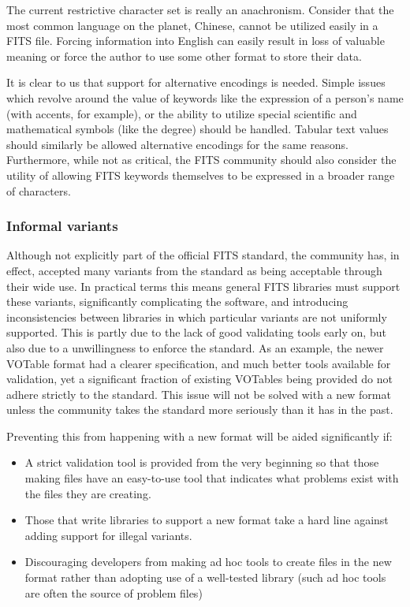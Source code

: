 \documentclass[final,authoryear,5p,times,twocolumn]{elsarticle}
\begin{document}
The current restrictive character set is really an
anachronism. Consider that the most common language on the planet,
Chinese, cannot be utilized easily in a FITS file. Forcing information
into English can easily result in loss of valuable meaning or force
the author to use some other format to store their data.


It is clear to us that support for alternative encodings is
needed. Simple issues which revolve around the value of keywords
like the expression of a person's name (with accents, for example), or
the ability to utilize special scientific and mathematical symbols
(like the degree) should be handled. Tabular text values should
similarly be allowed alternative encodings for the same
reasons. Furthermore, while not as critical, the FITS community should
also consider the utility of allowing FITS keywords themselves to be
expressed in a broader range of characters.


\subsubsection{Informal variants}


Although not explicitly part of the official FITS standard, the
community has, in effect, accepted many variants from the standard as
being acceptable through their wide use. In practical terms this means
general FITS libraries must support these variants, significantly
complicating the software, and introducing inconsistencies between
libraries in which particular variants are not uniformly
supported. This is partly due to the lack of good validating tools
early on, but also due to a unwillingness to enforce the standard. As
an example, the newer VOTable format \citep{2004tivo.conf..118O} had a
clearer specification, and much better tools available for validation,
yet a significant fraction of existing VOTables being provided do not
adhere strictly to the standard. This issue will not be solved with a
new format unless the community takes the standard more seriously than
it has in the past.


Preventing this from happening with a new format will be aided significantly if:

\begin{itemize}
\item A strict validation tool is provided from the very beginning so that
those making files have an easy-to-use tool that indicates what
problems exist with the files they are creating.

\item Those that write libraries to support a new format take a hard line
against adding support for illegal variants.

\item Discouraging developers from making ad hoc tools to create files in
the new format rather than adopting use of a well-tested library (such
ad hoc tools are often the source of problem files)
\end{itemize}
\end{document}
